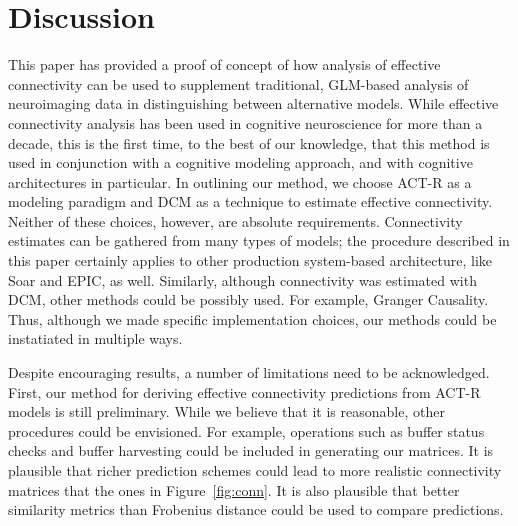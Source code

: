 \documentclass[10pt,letterpaper]{article}
\begin{document}
\section{Discussion}

This paper has provided a proof of concept of how analysis of effective connectivity can be used to supplement traditional, GLM-based analysis of neuroimaging data in distinguishing between alternative models. While effective connectivity analysis has been used in cognitive neuroscience for more than a decade, this is the first time, to the best of our knowledge, that this method is used in conjunction with a cognitive modeling approach, and with cognitive architectures in particular.
In outlining our method, we choose ACT-R as a modeling paradigm and DCM as a technique to estimate effective connectivity. Neither of these choices, however, are absolute requirements. Connectivity estimates can be gathered from many types of models; the procedure described in this paper certainly applies to other production system-based architecture, like Soar and EPIC, as well. Similarly, although connectivity was estimated with DCM,  other methods could be possibly used. For example, Granger Causality. Thus, although we made specific implementation choices, our methods could be instatiated in multiple ways.

Despite encouraging results, a number of limitations need to be acknowledged. First, our method for deriving effective connectivity predictions from ACT-R models is still preliminary. While we believe that it is reasonable, other procedures could be envisioned. For example, operations such as buffer status checks and buffer harvesting could be included in generating our matrices. It is plausible that richer prediction schemes could lead to more realistic connectivity matrices that the ones in Figure~\ref{fig:conn}. It is also plausible that better similarity metrics than Frobenius distance could be used to compare predictions.     %

\end{document}
